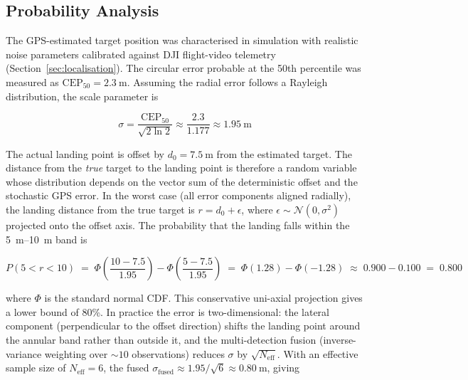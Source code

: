 \subsection{Probability Analysis}\label{sec:prob-analysis}

The GPS-estimated target position was characterised in simulation with realistic noise parameters calibrated against DJI flight-video telemetry (Section~\ref{sec:localisation}). The circular error probable at the 50th percentile was measured as $\mathrm{CEP}_{50} = \SI{2.3}{\metre}$. Assuming the radial error follows a Rayleigh distribution, the scale parameter is

\begin{equation}\label{eq:sigma-rayleigh}
    \sigma = \frac{\mathrm{CEP}_{50}}{\sqrt{2\ln 2}} \approx \frac{2.3}{1.177} \approx \SI{1.95}{\metre}
\end{equation}

\noindent The actual landing point is offset by $d_0 = \SI{7.5}{\metre}$ from the estimated target. The distance from the \emph{true} target to the landing point is therefore a random variable whose distribution depends on the vector sum of the deterministic offset and the stochastic GPS error. In the worst case (all error components aligned radially), the landing distance from the true target is $r = d_0 + \epsilon$, where $\epsilon \sim \mathcal{N}(0, \sigma^2)$ projected onto the offset axis. The probability that the landing falls within the \SIrange{5}{10}{\metre} band is

\begin{equation}\label{eq:pband}
    P(5 < r < 10) \;=\; \Phi\!\left(\frac{10 - 7.5}{1.95}\right) - \Phi\!\left(\frac{5 - 7.5}{1.95}\right) \;=\; \Phi(1.28) - \Phi(-1.28) \;\approx\; 0.900 - 0.100 \;=\; 0.800
\end{equation}

\noindent where $\Phi$ is the standard normal CDF. This conservative uni-axial projection gives a lower bound of 80\%. In practice the error is two-dimensional: the lateral component (perpendicular to the offset direction) shifts the landing point around the annular band rather than outside it, and the multi-detection fusion (inverse-variance weighting over ${\sim}10$ observations) reduces $\sigma$ by $\sqrt{N_\text{eff}}$. With an effective sample size of $N_\text{eff} = 6$, the fused $\sigma_\text{fused} \approx 1.95 / \sqrt{6} \approx \SI{0.80}{\metre}$, giving


